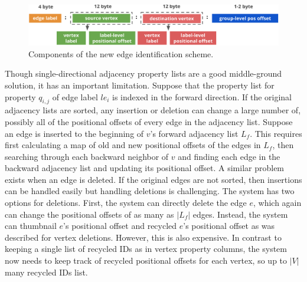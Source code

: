 \begin{figure}
	\hfill\includegraphics[scale=0.78]{img/edge-scheme}\hspace*{\fill}
	\captionsetup{justification=centering}
	\caption{Components of the new edge identification scheme. }
	\label{fig:edge-scheme}
\end{figure}

 Though single-directional adjacency property lists are a good middle-ground solution, it has an important limitation. Suppose that the property list for property $q_{i,j}$ of edge label $le_i$ is indexed in the forward direction. If the original adjacency lists are sorted,  any insertion or deletion can change a large number of, possibly all of the positional offsets of every edge in the adjacency list. Suppose an edge is inserted to the beginning of $v$'s forward adjacency list $L_f$. This requires first calculating a map of old and new positional offsets of the edges in $L_f$, then searching through each backward neighbor of $v$ and finding each edge in the backward adjacency list and updating its positional offset. A similar problem exists when an edge is deleted. If the original edges are not sorted, then insertions can be handled easily but handling deletions is challenging. The system has two options for deletions. First, the system can directly delete the edge $e$, which again can change the positional offsets of as many as $|L_f|$ edges. Instead, the system can thumbnail $e$'s positional offset and recycled $e$'s positional offset as was described for vertex deletions. However, this is also expensive. In contrast to keeping a single list of recycled IDs as in vertex property columns, the system now needs to keep track of recycled positional offsets for each vertex, so up to $|V|$ many recycled IDs list.

